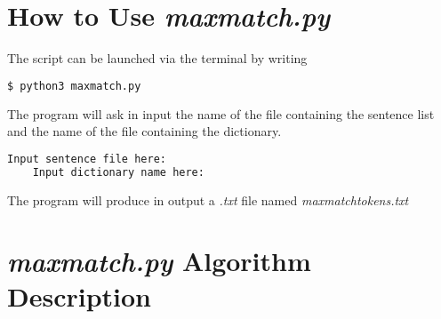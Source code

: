 \documentclass{hitec}
\begin{document}
	\section{How to Use \textit{maxmatch.py}}
	The script can be launched via the terminal by writing \begin{lstlisting}[language=bash]
	$ python3 maxmatch.py
	\end{lstlisting}
	The program will ask in input the name of the file containing the sentence list and the name of the file containing the dictionary.
	\begin{lstlisting}[language=bash]
	Input sentence file here: 
	Input dictionary name here: 
	\end{lstlisting}
	The program will produce in output a \textit{.txt} file named \textit{maxmatchtokens.txt}
	\section{\textit{maxmatch.py} Algorithm Description}
\end{document}

